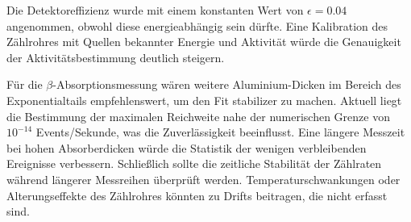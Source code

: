 Die Detektoreffizienz wurde mit einem konstanten Wert von $\epsilon = 0.04$ angenommen, obwohl diese energieabhängig sein dürfte. Eine Kalibration des Zählrohres mit Quellen bekannter Energie und Aktivität würde die Genauigkeit der Aktivitätsbestimmung deutlich steigern.

Für die $\beta$-Absorptionsmessung wären weitere Aluminium-Dicken im Bereich des Exponentialtails empfehlenswert, um den Fit stabilizer zu machen. Aktuell liegt die Bestimmung der maximalen Reichweite nahe der numerischen Grenze von $10^{-14}$ Events/Sekunde, was die Zuverlässigkeit beeinflusst. Eine längere Messzeit bei hohen Absorberdicken würde die Statistik der wenigen verbleibenden Ereignisse verbessern.
Schließlich sollte die zeitliche Stabilität der Zählraten während längerer Messreihen überprüft werden. Temperaturschwankungen oder Alterungseffekte des Zählrohres könnten zu Drifts beitragen, die nicht erfasst sind.